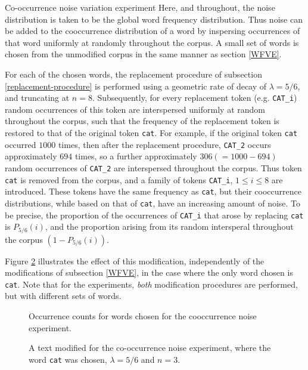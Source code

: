 \documentclass{article} %
\newcommand{\word}[1]{\texttt{#1}}
\begin{document}
\begin{section}{Co-occurrence noise variation experiment}\label{CNVE}
Here, and throughout, the noise distribution is taken to be the global word frequency distribution.
Thus noise can be added to the cooccurrence distribution of a word by inspersing occurrences of that word uniformly at randomly throughout the corpus.
A small set of words is chosen from the unmodified corpus in the same manner as section \ref{WFVE}.

For each of the chosen words, the replacement procedure of subsection \ref{replacement-procedure} is performed using a geometric rate of decay of $\lambda = 5/6$, and truncating at $n=8$.
Subsequently, for every replacement token (e.g. \word{CAT\_i}) random occurrences of this token are interspersed uniformly at random throughout the corpus, such that the frequency of the replacement token is restored to that of the original token \word{cat}.
For example, if the original token \word{cat} occurred $1000$ times, then after the replacement procedure, \word{CAT\_2} occurs approximately $694$ times, so a further approximately $306 (=1000 - 694)$ random occurrences of \word{CAT\_2} are interspersed throughout the corpus.
Thus token \word{cat} is removed from the corpus, and a family of tokens \word{CAT\_i}, $1 \leqslant i \leqslant 8$ are introduced.
These tokens have the same frequency as \word{cat}, but their cooccurrence distributions, while based on that of \word{cat}, have an increasing amount of noise.
To be precise, the proportion of the occurrences of \word{CAT\_i} that arose by replacing \word{cat} is $P_{5/6}(i)$, and the proportion arising from its random intersperal throughout the corpus $(1 - P_{5/6}(i))$.

Figure \ref{fig:cooccurrence-noise-experiment-text} illustrates the effect of this modification, independently of the modifications of subsection \ref{WFVE}, in the case where the only word chosen is \word{cat}.
Note that for the experiments, \emph{both} modification procedures are performed, but with different sets of words.

\begin{figure}
	
	\label{fig:cooccurrence-noise-counts}
	\caption{Occurrence counts for words chosen for the cooccurrence noise experiment. }
\end{figure}

\begin{figure}
	
	\caption{A text modified for the co-occurrence noise experiment, where the word \word{cat} was chosen, $\lambda = 5/6$ and $n=3$.}
\label{fig:cooccurrence-noise-experiment-text}
\end{figure}


\end{section}
\end{document}
